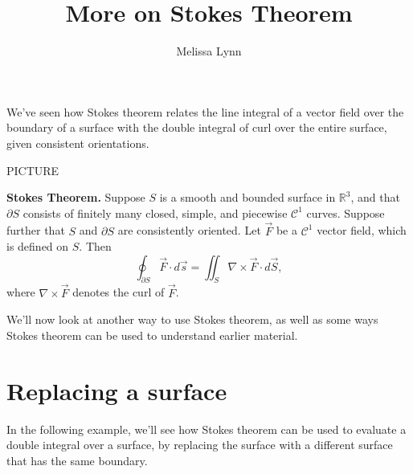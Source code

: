 \documentclass{ximera}
\title{More on Stokes Theorem}
\author{Melissa Lynn}
\begin{document}
  
\begin{abstract}  
\end{abstract}  
\maketitle  

We've seen how Stokes theorem relates the line integral of a vector field over the boundary of a surface with the double integral of curl over the entire surface, given consistent orientations.

PICTURE

\begin{theorem}
\textbf{Stokes Theorem.} Suppose $S$ is a smooth and bounded surface in $\mathbb{R}^3$, and that $\partial S$ consists of finitely many closed, simple, and piecewise $\mathcal{C}^1$ curves. Suppose further that $S$ and $\partial S$ are consistently oriented. Let $\vec{F}$ be a $\mathcal{C}^1$ vector field, which is defined on $S$. Then
\[
\oint_{\partial S}\vec{F}\cdot d\vec{s} = \iint_S \nabla\times \vec{F}\cdot d\vec{S},
\]
where $\nabla\times \vec{F}$ denotes the curl of $\vec{F}$.
\end{theorem}

We'll now look at another way to use Stokes theorem, as well as some ways Stokes theorem can be used to understand earlier material.

\section*{Replacing a surface}

In the following example, we'll see how Stokes theorem can be used to evaluate a double integral over a surface, by replacing the surface with a different surface that has the same boundary.
\end{document}
